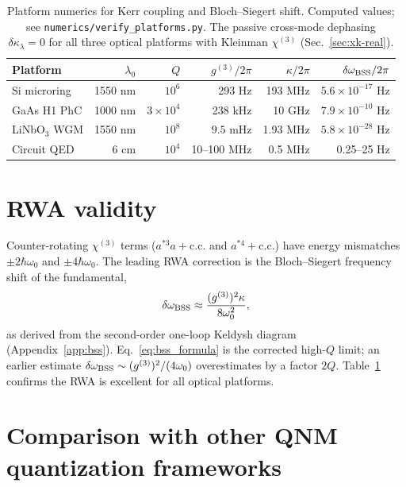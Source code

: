 \documentclass[11pt]{article}
\newcommand{\BSS}{{\rm BSS}}
\begin{document}
\begin{table}[h]
\centering\small
\begin{tabular}{lrrrrr}
\toprule
Platform & $\lambda_0$ & $Q$ & $g^{(3)}/2\pi$ & $\kappa/2\pi$ & $\delta\omega_\BSS/2\pi$\\
\midrule
Si microring         & 1550 nm  & $10^6$        & 293 Hz     & 193 MHz  & $5.6\times 10^{-17}$ Hz \\
GaAs H1 PhC          & 1000 nm  & $3\times 10^4$ & 238 kHz    & 10 GHz   & $7.9\times 10^{-10}$ Hz \\
LiNbO$_3$ WGM        & 1550 nm  & $10^8$        & $9.5$ mHz  & 1.93 MHz & $5.8\times 10^{-28}$ Hz \\
Circuit QED          & 6 cm     & $10^4$        & 10--100 MHz & 0.5 MHz & 0.25--25 Hz \\
\bottomrule
\end{tabular}
\caption{Platform numerics for Kerr coupling and Bloch--Siegert shift.
Computed values; see \texttt{numerics/verify\_platforms.py}.
The passive cross-mode dephasing $\delta\kappa_\lambda=0$ for all three
optical platforms with Kleinman $\chi^{(3)}$ (Sec.~\ref{sec:xk-real}).}
\label{tab:platforms}
\end{table}

\section{RWA validity}
\label{sec:rwa-validity}

Counter-rotating $\chi^{(3)}$ terms ($a^{*3}a+\mathrm{c.c.}$ and
$a^{*4}+\mathrm{c.c.}$) have energy mismatches $\pm2\hbar\omega_0$
and $\pm4\hbar\omega_0$.  The leading RWA correction is the
Bloch--Siegert frequency shift of the fundamental,
\begin{equation}
  \delta\omega_\BSS\approx\frac{(g^{(3)})^2\kappa}{8\omega_0^2},
  \label{eq:bss_formula}
\end{equation}
as derived from the second-order one-loop Keldysh diagram
(Appendix~\ref{app:bss}).  Eq.~\eqref{eq:bss_formula} is the
corrected high-$Q$ limit; an earlier estimate $\delta\omega_\BSS\sim
(g^{(3)})^2/(4\omega_0)$ overestimates by a factor $2Q$.
Table~\ref{tab:platforms} confirms the RWA is excellent for all
optical platforms.

\section{Comparison with other QNM quantization frameworks}
\label{sec:comparison}
\end{document}
